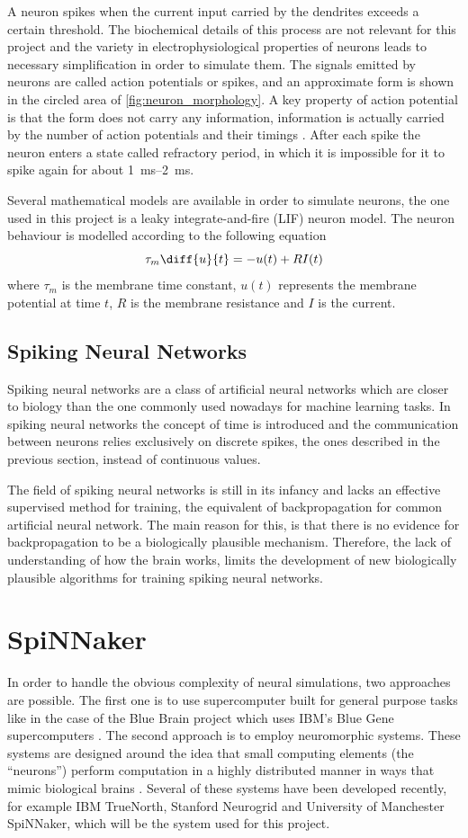 A neuron spikes when the current input carried by the dendrites exceeds a certain threshold. The biochemical details of this process are not relevant for this project and the variety in electrophysiological properties of neurons \cite{Llinas:2008} leads to necessary simplification in order to simulate them. The signals emitted by neurons are called action potentials or spikes, and an approximate form is shown in the circled area of  \cref{fig:neuron_morphology}. A key property of action potential is that the form does not carry any information, information is actually carried by the number of action potentials and their timings \cite{Gerstner:2014}. After each spike the neuron enters a state called refractory period, in which it is impossible for it to spike again for about \SIrange{1}{2}{\milli\second}.

Several mathematical models are available in order to simulate neurons, the one used in this project is a leaky integrate-and-fire (LIF) neuron model. The neuron behaviour is modelled according to the following equation
\[
\tau_m \diff{u}{t} = -u(t)+RI(t)
\]
where $\tau_m$ is the membrane time constant, $u(t)$ represents the membrane potential at time $t$, $R$ is the membrane resistance and $I$ is the current. 

\subsection{Spiking Neural Networks}
Spiking neural networks are a class of artificial neural networks which are closer to biology than the one commonly used nowadays for machine learning tasks. In spiking neural networks the concept of time is introduced and the communication between neurons relies exclusively on discrete spikes, the ones described in the previous section, instead of continuous values. 

The field of spiking neural networks is still in its infancy and lacks an effective supervised method for training, the equivalent of backpropagation for common artificial neural network. The main reason for this, is that there is no evidence for backpropagation to be a biologically plausible mechanism. Therefore, the lack of understanding of how the brain works, limits the development of new biologically plausible algorithms for training spiking neural networks. 


\section{SpiNNaker}
In order to handle the obvious complexity of neural simulations, two approaches are possible. The first one is to use supercomputer built for general purpose tasks like in the case of the Blue Brain project which uses IBM's Blue Gene supercomputers \cite{Markram2006}. The second approach is to employ neuromorphic systems. These systems are designed around the idea that small computing elements (the ``neurons'') perform computation in a highly distributed manner in ways that mimic biological brains \cite{Furber2016}. Several of these systems have been developed recently, for example IBM TrueNorth, Stanford Neurogrid and University of Manchester SpiNNaker, which will be the system used for this project.

